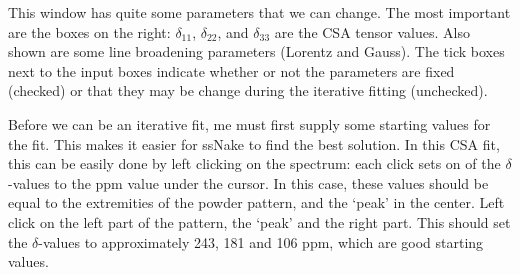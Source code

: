 \documentclass[11pt,a4paper]{article}
\begin{document}
This window has quite some parameters that we can change. The most important are the boxes on the
right: $\delta_{11}$, $\delta_{22}$, and $\delta_{33}$ are the CSA tensor values. Also shown are some
line broadening parameters (Lorentz and Gauss). The tick boxes next to the input boxes indicate
whether or not the parameters are fixed (checked) or that they may be change during the iterative
fitting (unchecked).

Before we can be an iterative fit, me must first supply some starting values for the fit. This makes
it easier for ssNake to find the best solution. In this CSA fit, this can be easily done by left
clicking on the spectrum: each click sets on of the $\delta$-values to the ppm value under the
cursor. In this case, these values should be equal to the extremities of the powder pattern, and
the `peak' in the center. Left click on the left part of the pattern, the `peak' and the right part.
This should set the $\delta$-values to approximately 243, 181 and 106 ppm, which are good starting
values.
\end{document}
